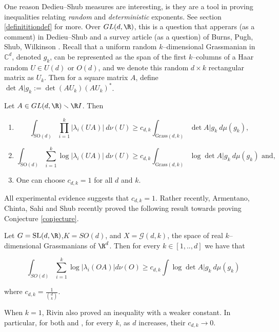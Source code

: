 \documentclass[10pt]{amsart}
\numberwithin{equation}{section}     %
\newcommand{\C}{\mathbb{C}}
\newcommand{\SL}{\mathrm{SL}}
\newcommand{\SO}{\mathrm{SO}}
\renewcommand{\setminus}{\smallsetminus}
\begin{document}
One reason Dedieu--Shub measures are interesting, is they are a tool in proving inequalities relating \textit{random} and \textit{deterministic} exponents. See section \ref{definititiondef} for more. Over $GL(d,\R)$, this is a question that apperars (as a comment) in Dedieu--Shub \cite{dedieu2003mike} and a survey article (as a question) of Burns, Pugh, Shub, Wilkinson \cite{burns2001recent}. Recall that a uniform random $k$--dimensional Grassmanian in $\C^d$, denoted $g_{k}$, can be represented as the span of the first $k$--columns of a Haar random $U \in U(d)$ or $O(d)$, and we denote this random $d \times k$ rectangular matrix as $U_k$. Then for a square matrix $A$, define $\det A|g_k := \det (AU_k)(AU_k)^*$. 

\begin{conjecture} \label{conjecture}
     Let $A \in GL(d,\R) \setminus \R I$. Then
     \begin{enumerate}
         \item $$\int_{\SO(d)} \prod \limits_{i=1}^k |\lambda_i (UA )| \ d\nu(U) \geq c_{d,k} \int_{\text{Grass}(d,k)} \det A|g_{k} \ d\mu(g_{k}),$$
         \item $$\int_{\SO(d)} \sum \limits_{i=1}^k \log |\lambda_i (UA )| \ d\nu(U) \geq c_{d,k} \int_{\text{Grass}(d,k)} \log \det A|g_{k} \ d\mu(g_{k})\text{ and,}$$
         \item One can choose $c_{d,k} = 1$ for all $d$ and $k$. 
     \end{enumerate}
\end{conjecture}

All experimental evidence suggests that $c_{d,k} = 1$. Rather recently, Armentano, Chinta, Sahi and Shub \cite{armentanorandom} recently proved the following result towards proving Conjecture \ref{conjecture}. 

\begin{theorem}
Let $G = \SL(d,\R)$,$K = SO(d)$, and $X = \mathcal{G}(d,k)$, the space of real $k$--dimensional Grassmanians of $\R^d$. Then for every $k \in [1,..,d]$ we have that 

$$\int_{SO(d)} \sum_{i=1}^k \log |\lambda_i(OA)| d\nu(O) \geq c_{d,k} \int \log \det A | g_{k} \ d\mu(g_{k})$$

 where $c_{d,k} = \frac{1}{\binom{d}{k}}$.
\end{theorem}

When $k=1$, Rivin \cite{rivin2005CMP} also proved an inequality with a weaker constant. In particular, for both \cite{armentanorandom} and \cite{rivin2005CMP}, for every $k$, as $d$ increases, their $c_{d,k} \to 0$.
\end{document}
